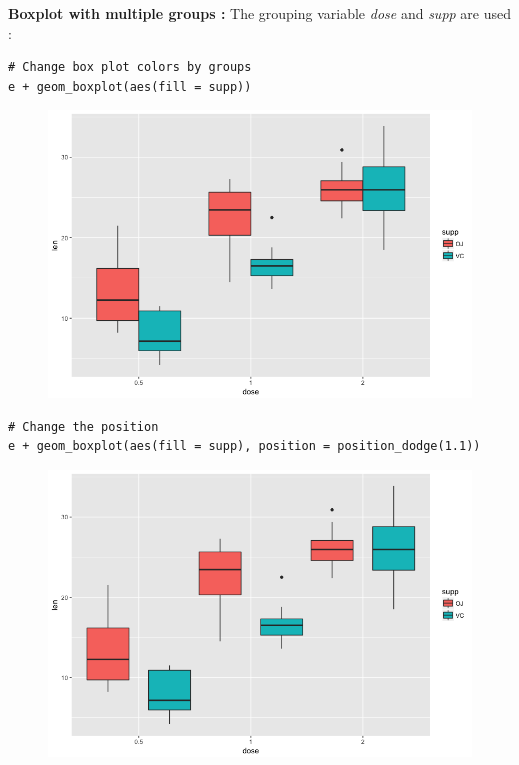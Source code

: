 \textbf{Boxplot with multiple groups : } The grouping variable \textit{dose} and \textit{supp} are used :
\begin{lstlisting}[language=html]
# Change box plot colors by groups
e + geom_boxplot(aes(fill = supp))
\end{lstlisting}
\begin{figure}[H]\begin{center}\includegraphics[scale=1 ]{ilu/bg86.png}\end{center}\end{figure}
\begin{lstlisting}[language=html]
# Change the position
e + geom_boxplot(aes(fill = supp), position = position_dodge(1.1))
\end{lstlisting}
\begin{figure}[H]\begin{center}\includegraphics[scale=1 ]{ilu/bg87.png}\end{center}\end{figure}
